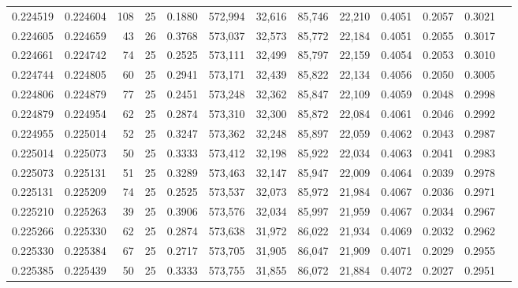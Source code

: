 \begin{tabular}{rrrrrrrrrrrrr}
0.224519 & 0.224604 &   108 &  25 &                                     0.1880 & 572,994 &  32,616 &  85,746 &  22,210 & 0.4051 & 0.2057 & 0.3021 \\
0.224605 & 0.224659 &    43 &  26 &                                     0.3768 & 573,037 &  32,573 &  85,772 &  22,184 & 0.4051 & 0.2055 & 0.3017 \\
0.224661 & 0.224742 &    74 &  25 &                                     0.2525 & 573,111 &  32,499 &  85,797 &  22,159 & 0.4054 & 0.2053 & 0.3010 \\
0.224744 & 0.224805 &    60 &  25 &                                     0.2941 & 573,171 &  32,439 &  85,822 &  22,134 & 0.4056 & 0.2050 & 0.3005 \\
0.224806 & 0.224879 &    77 &  25 &                                     0.2451 & 573,248 &  32,362 &  85,847 &  22,109 & 0.4059 & 0.2048 & 0.2998 \\
0.224879 & 0.224954 &    62 &  25 &                                     0.2874 & 573,310 &  32,300 &  85,872 &  22,084 & 0.4061 & 0.2046 & 0.2992 \\
0.224955 & 0.225014 &    52 &  25 &                                     0.3247 & 573,362 &  32,248 &  85,897 &  22,059 & 0.4062 & 0.2043 & 0.2987 \\
0.225014 & 0.225073 &    50 &  25 &                                     0.3333 & 573,412 &  32,198 &  85,922 &  22,034 & 0.4063 & 0.2041 & 0.2983 \\
0.225073 & 0.225131 &    51 &  25 &                                     0.3289 & 573,463 &  32,147 &  85,947 &  22,009 & 0.4064 & 0.2039 & 0.2978 \\
0.225131 & 0.225209 &    74 &  25 &                                     0.2525 & 573,537 &  32,073 &  85,972 &  21,984 & 0.4067 & 0.2036 & 0.2971 \\
0.225210 & 0.225263 &    39 &  25 &                                     0.3906 & 573,576 &  32,034 &  85,997 &  21,959 & 0.4067 & 0.2034 & 0.2967 \\
0.225266 & 0.225330 &    62 &  25 &                                     0.2874 & 573,638 &  31,972 &  86,022 &  21,934 & 0.4069 & 0.2032 & 0.2962 \\
0.225330 & 0.225384 &    67 &  25 &                                     0.2717 & 573,705 &  31,905 &  86,047 &  21,909 & 0.4071 & 0.2029 & 0.2955 \\
0.225385 & 0.225439 &    50 &  25 &                                     0.3333 & 573,755 &  31,855 &  86,072 &  21,884 & 0.4072 & 0.2027 & 0.2951 \\

\end{tabular}
